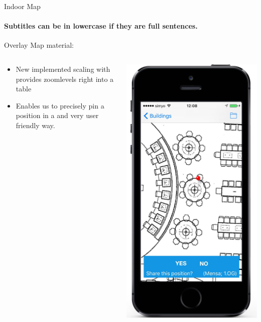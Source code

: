 \documentclass[11pt]{beamer}
\begin{document}
\begin{frame}{Indoor Map}

\framesubtitle{Subtitles can be in lowercase if they are full sentences.}
Overlay Map material:

  \begin{columns}[T]
  \begin{column}{.6\textwidth}
  \begin{itemize}
    \item New implemented scaling with provides zoomlevels right into a table
    \item Enables us to precisely pin a position in a and very user friendly way.
  \end{itemize}
  \end{column}
  \begin{column}{.4\textwidth}
  \includegraphics[scale=0.25]{mappinpointa}
  \end{column}
\end{columns}


\end{frame}
\end{document}
